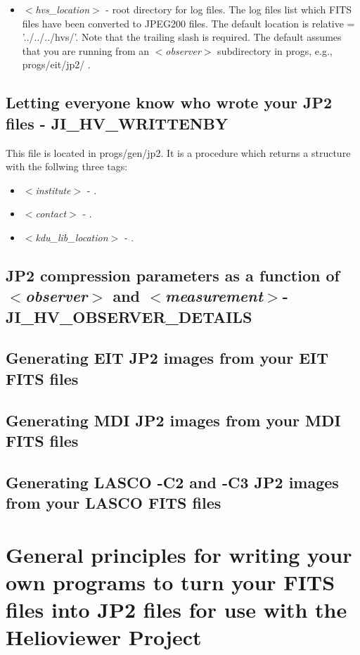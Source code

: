 \documentclass[namedreferences]{SolarPhysics}
\newcommand{\cvar}[1]{$<${\it #1}$>$}
\begin{document}
\begin{article}
\begin{itemize}
\item \cvar{hvs\_location} - root directory for log files. The log
  files list which FITS files have been converted to JPEG200
  files. The default location is relative = '../../../hvs/'.  Note
  that the trailing slash is required.  The default assumes that you
  are running from an \cvar{observer} subdirectory in progs, e.g.,
  progs/eit/jp2/ .
\end{itemize}

\subsection{Letting everyone know who wrote your JP2 files - JI\_HV\_WRITTENBY}

This file is located in progs/gen/jp2.  It is a procedure which
returns a structure with the follwing three tags:
\begin{itemize}
\item \cvar{institute} - .

\item \cvar{contact} - .

\item \cvar{kdu\_lib\_location} - .

\end{itemize}


\subsection{JP2 compression parameters as a function of
  \cvar{observer} and \cvar{measurement}- JI\_HV\_OBSERVER\_DETAILS}



\subsection{Generating EIT JP2 images from your EIT FITS files}

\subsection{Generating MDI JP2 images from your MDI FITS files}

\subsection{Generating LASCO -C2 and -C3 JP2 images from your LASCO FITS files}



\section{General principles for writing your own programs to turn your
  FITS files into JP2 files for use with the Helioviewer Project}


\end{article}
\end{document}
